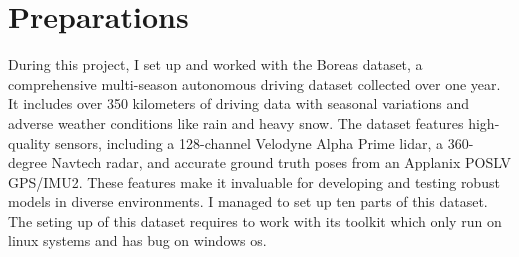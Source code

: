 \chapter{Preparations}

During this project, I set up and worked with the Boreas dataset, a comprehensive multi-season autonomous driving dataset collected over one year. It includes over 350 kilometers of driving data with seasonal variations and adverse weather conditions like rain and heavy snow. The dataset features high-quality sensors, including a 128-channel Velodyne Alpha Prime lidar, a 360-degree Navtech radar, and accurate ground truth poses from an Applanix POSLV GPS/IMU2. These features make it invaluable for developing and testing robust models in diverse environments.
I managed to set up ten parts of this dataset. The seting up of this dataset requires to work with its toolkit which only run on linux systems and has bug on windows os. 